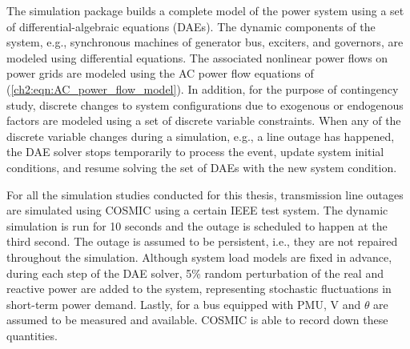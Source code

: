 The simulation package builds a complete model of the power system using a set of differential-algebraic equations (DAEs). The dynamic components of the system, e.g., synchronous machines of generator bus, exciters, and governors, are modeled using differential equations. The associated nonlinear power flows on power grids are modeled using the AC power flow equations of (\ref{ch2:eqn:AC_power_flow_model}).  
In addition, for the purpose of contingency study, discrete changes to system configurations due to exogenous or endogenous factors are modeled using a set of discrete variable constraints. When any of the discrete variable changes during a simulation, e.g., a line outage has happened, the DAE solver stops temporarily to process the event, update system initial conditions, and resume solving the set of DAEs with the new system condition. 

For all the simulation studies conducted for this thesis, transmission line outages are simulated using COSMIC using a certain IEEE test system. The dynamic simulation is run for 10 seconds and the outage is scheduled to happen at the third second. The outage is assumed to be persistent, i.e., they are not repaired throughout the simulation. Although system load models are fixed in advance, during each step of the DAE solver, 5\% random perturbation of the real and reactive power are added to the system, representing stochastic fluctuations in short-term power demand. Lastly, for a bus equipped with PMU, V and $\theta$ are assumed to be measured and available. COSMIC is able to record down these quantities. 


